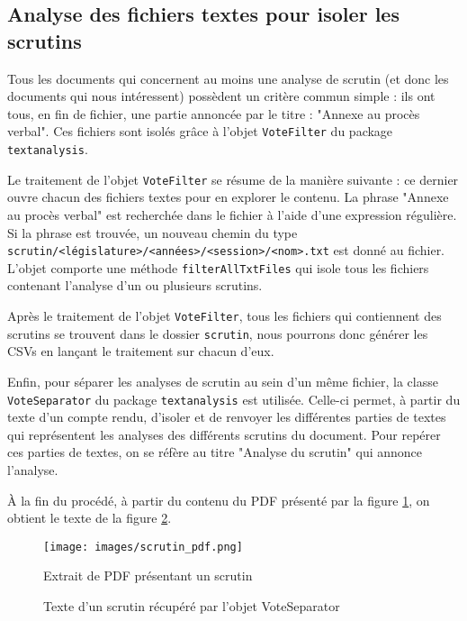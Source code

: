 \subsection{Analyse des fichiers textes pour isoler les scrutins}

Tous les documents qui concernent au moins une analyse de scrutin (et donc les documents qui nous intéressent) possèdent un critère commun simple : ils ont tous, en fin de fichier, une partie annoncée par le titre : "Annexe au procès verbal". Ces fichiers sont isolés grâce à l'objet \verb|VoteFilter| du package \verb|textanalysis|.

Le traitement de l'objet \verb|VoteFilter| se résume de la manière suivante : ce dernier ouvre chacun des fichiers textes pour en explorer le contenu. La phrase "Annexe au procès verbal" est recherchée dans le fichier à l'aide d'une expression régulière. Si la phrase est trouvée, un nouveau chemin du type \verb|scrutin/<législature>/<années>/<session>/<nom>.txt| est donné au fichier. L'objet comporte une méthode \verb|filterAllTxtFiles| qui isole tous les fichiers contenant l'analyse d'un ou plusieurs scrutins.

Après le traitement de l'objet \verb|VoteFilter|, tous les fichiers qui contiennent des scrutins se trouvent dans le dossier \verb|scrutin|, nous pourrons donc générer les CSVs en lançant le traitement sur chacun d'eux.

Enfin, pour séparer les analyses de scrutin au sein d'un même fichier, la classe \verb|VoteSeparator| du package \verb|textanalysis| est utilisée. Celle-ci permet, à partir du texte d'un compte rendu, d'isoler et de renvoyer les différentes parties de textes qui représentent les analyses des différents scrutins du document. Pour repérer ces parties de textes, on se réfère au titre "Analyse du scrutin" qui annonce l'analyse.

À la fin du procédé, à partir du contenu du PDF présenté par la figure \ref{scrutin_pdf}, on obtient le texte de la figure \ref{scrutin_txt}.

\newpage

\begin{figure}[!h]
\begin{center}
\texttt{[image: images/scrutin\_pdf.png]}
\caption{Extrait de PDF présentant un scrutin}
\label{scrutin_pdf}
\end{center}
\end{figure}

\begin{figure}
\caption{Texte d'un scrutin récupéré par l'objet VoteSeparator}
\label{scrutin_txt}
\end{figure}
